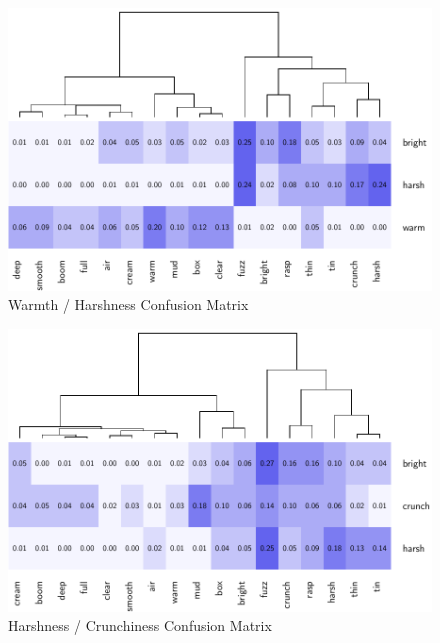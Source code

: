 		\newpage

		\begin{figure}[h!]
			\centering
			\includegraphics{chapter7/Images/HarshConfusion.pdf}
			\caption{Warmth / Harshness Confusion Matrix}
		\end{figure}

		\begin{figure}[h!]
			\centering
			\includegraphics{chapter7/Images/CrunchConfusion.pdf}
			\caption{Harshness / Crunchiness Confusion Matrix}
		\end{figure}

